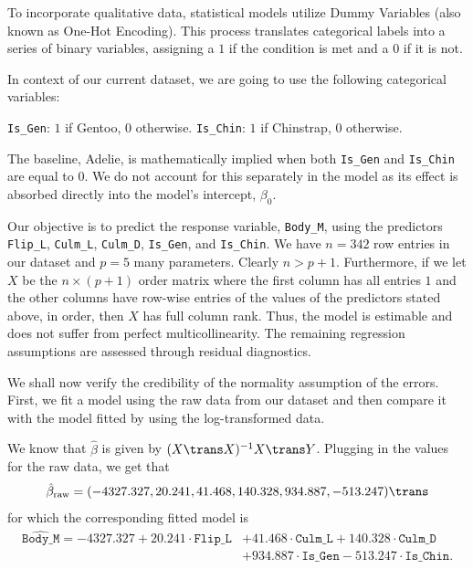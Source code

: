 \documentclass[12pt]{article}
\begin{document}
To incorporate qualitative data, statistical models
utilize Dummy Variables (also known as One-Hot Encoding).
This process translates categorical labels into a series of
binary variables, assigning a $1$ if the condition is met
and a $0$ if it is not.

In context of our current dataset, we are going to
use the following categorical variables:
\begin{itemize}
    \ii \texttt{Is\_Gen}: $1$ if Gentoo, $0$ otherwise.
    \ii \texttt{Is\_Chin}: $1$ if Chinstrap, $0$ otherwise.
\end{itemize}
The baseline, Adelie, is mathematically implied when both
\texttt{Is\_Gen} and \texttt{Is\_Chin} are equal to $0$.
We do not account for this separately in the model as
its effect is absorbed directly
into the model's intercept, $\beta_0$.

Our objective is to predict the response variable,
\texttt{Body\_M}, using the predictors \texttt{Flip\_L},
\texttt{Culm\_L}, \texttt{Culm\_D}, \texttt{Is\_Gen}, and
\texttt{Is\_Chin}. We have $n=342$ row entries in our dataset and
$p=5$ many parameters.
Clearly $n > p+1$. Furthermore,
if we let $X$ be the $n \times (p+1)$ order matrix
where the first column has all entries $1$ and the other columns
have row-wise entries of the values of the predictors
stated above, in order, then $X$ has full column rank.
Thus, the model is estimable and does not suffer from
perfect multicollinearity.
The remaining regression assumptions are assessed
through residual diagnostics.

We shall now verify the credibility of the normality assumption
of the errors. First, we fit a model using the raw data from our
dataset and then compare it with the model fitted by using
the log-transformed data.

We know that $\hat{\beta}$ is given by $(X\trans X)^{-1} X\trans Y$.
Plugging in the values for the raw data, we get that
\[
  \hat{\beta}_{\text{raw}}
  = (-4327.327, 20.241, 41.468, 140.328, 934.887, -513.247)\trans
\]
for which the corresponding fitted model is
\begin{align*}
  \widehat{\texttt{Body\_M}} = -4327.327
  + 20.241\cdot\texttt{Flip\_L}
  &+ 41.468\cdot\texttt{Culm\_L}
  + 140.328\cdot\texttt{Culm\_D} \\
  &+ 934.887\cdot\texttt{Is\_Gen}
  -513.247\cdot\texttt{Is\_Chin}
  .
\end{align*}
\end{document}
